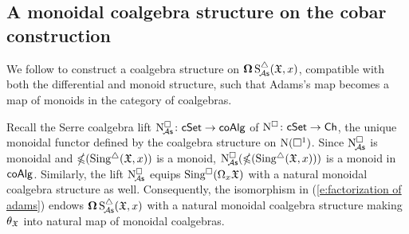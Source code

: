 \subsection{A monoidal coalgebra structure on the cobar construction}

We follow \cite{baues1998hopf} to construct a coalgebra structure on $\cobar \sSchainsA(\fX,x)$, compatible with both the differential and monoid structure, such that Adams's map becomes a map of monoids in the category of coalgebras.

Recall the Serre coalgebra lift $\cchainsA \colon \cSet \to \coAlg$ of $\cchains \colon \cSet \to \Ch$, the unique monoidal functor defined by the coalgebra structure on $\chains(\cube^1)$.
Since $\cchainsA$ is monoidal and $\ccobar(\sSing(\fX,x))$ is a monoid, $\cchainsA(\ccobar(\sSing(\fX,x)))$ is a monoid in $\coAlg$.
Similarly, the lift $\cchainsA$ equips $\cSing(\loops_x \fX)$ with a natural monoidal coalgebra structure as well.
Consequently, the isomorphism in (\ref{e:factorization of adams}) endows $\cobar \sSchainsA(\fX,x)$ with a natural monoidal coalgebra structure making $\theta_\fX$ into natural map of monoidal coalgebras.